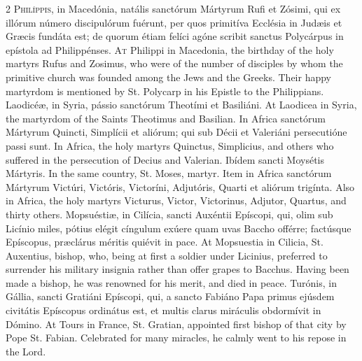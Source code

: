 \begin{paracol}{2}
\lettrine[lines=2]{P}{hilíppis,} in Macedónia, natális sanctórum Mártyrum Rufi et Zósimi, 
 qui ex illórum número discipulórum fuérunt, per quos primitíva Ecclésia in 
 Judæis et Græcis fundáta est; de quorum étiam felíci agóne scribit sanctus 
 Polycárpus in epístola ad Philippénses.
\switchcolumn
{}
\lettrine[lines=2]{A}{t} Philippi in Macedonia, the birthday of the holy martyrs Rufus and Zosimus, 
 who were of the number of disciples by whom the primitive church was founded 
 among the Jews and the Greeks. Their happy martyrdom is mentioned by 
 St. Polycarp in his Epistle to the Philippians.
\switchcolumn*
{}
Laodicéæ, in Syria, pássio sanctórum Theotími 
 et Basiliáni.
\switchcolumn
{}
At Laodicea in Syria, the martyrdom of the Saints Theotimus and Basilian.
\switchcolumn*
{}
In Africa sanctórum Mártyrum Quincti, Simplícii et aliórum; qui sub Décii et 
 Valeriáni persecutióne passi sunt.
\switchcolumn
{}
In 
 Africa, the holy martyrs Quinctus, Simplicius, and others who suffered in 
 the persecution of Decius and Valerian.
\switchcolumn*
{}
Ibídem sancti Moysétis Mártyris.
\switchcolumn
{}
In 
 the same country, St. Moses, martyr.
\switchcolumn*
{}
Item in Africa sanctórum Mártyrum Victúri, Victóris, Victoríni, Adjutóris, Quarti et 
 aliórum trigínta.
\switchcolumn
{}
Also in Africa, the holy martyrs Victurus, Victor, Victorinus, Adjutor, 
 Quartus, and thirty others.
\switchcolumn*
{}
Mopsuéstiæ, in Cilícia, sancti Auxéntii 
 Epíscopi, qui, olim sub Licínio miles, pótius elégit cíngulum exúere quam 
 uvas Baccho offérre; factúsque Epíscopus, præclárus méritis quiévit in pace.
\switchcolumn
{}
At 
 Mopsuestia in Cilicia, St. Auxentius, bishop, who, being at first a soldier 
 under Licinius, preferred to surrender his military insignia rather than 
 offer grapes to Bacchus. Having been made a bishop, he was renowned 
 for his merit, and died in peace.
\switchcolumn*
{}
Turónis, in Gállia, sancti Gratiáni Epíscopi, qui, a sancto Fabiáno Papa 
 primus ejúsdem civitátis Epíscopus ordinátus est, et multis clarus miráculis 
 obdormívit in Dómino.
\switchcolumn
{}
At 
 Tours in France, St. Gratian, appointed first bishop of that city by Pope 
 St. Fabian. Celebrated for many miracles, he calmly went to his repose 
 in the Lord.
\switchcolumn*
{}
\end{paracol}


